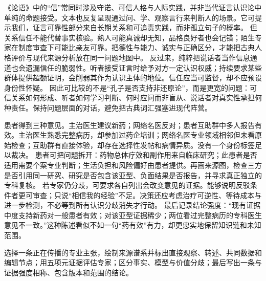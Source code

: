 《论语》中的“信”常同时涉及守诺、可信人格与人际实践，并非当代证言认识论中单纯的命题接受。文本也反复呈现通过问、学、观察言行来判断人的场景\parencite{analects2003}。它可提示我们，证言可靠性部分来自长期关系和可追责实践，而非孤立句子的概率。 但关系信任不能代替事实核验。熟人可能真诚却无知，品格良好者也会记错；陌生专家在制度审查下可能比亲友可靠。把德性与能力、诚实与正确区分，才能把古典人格评价与现代来源分析放在同一问题地图中。 反过来，纯粹把说话者当作信息通道也会遗漏信任的脆弱性。听者接受证言时给予对方一定认识权威；持续要求某些群体提供超额证明，会削弱其作为认识主体的地位。信任应当可监督，却不应预设身份性怀疑。 因此可比较的不是“孔子是否支持非还原论”，而是更宽的问题：可信关系如何形成、听者如何学习判断、何时应问而非盲从、说话者对真实性承担何种责任。保持问题层面的对话，避免把古典词汇强塞进现代阵营。

患者得到三种意见。主治医生建议新药；网络名医反对；患者互助群中多人报告有效。主治医生熟悉完整病历，却参加过药企培训；网络名医专业领域相邻但未看原始检查；互助群有直接体验，却存在选择性发帖和病情异质。没有一个身份标签足以裁决。 患者可把问题拆开：药物总体疗效和副作用来自临床研究；此患者是否适用需要个案专业判断；生活负担和风险偏好由患者提供。再画来源图，检查三方是否引用同一研究、研究是否包含该亚型、负面结果是否报告，并寻求真正独立的专科复核。 若专家仍分歧，可要求各自列出会改变意见的证据。能够说明反驳条件者更可审查；只说“相信我的经验”不足。决策还应考虑治疗可逆性、等待成本与进一步检测，不必等到所有认识分歧消失才行动。 最后记录结论强度：“现有证据中度支持新药对一般患者有效；对该亚型证据稀少；两位看过完整病历的专科医生意见不一致。”这种陈述看似不如一句“药有效”有力，却更忠实地保留知识链和未知范围。

\begin{tcolorbox}[breakable,colback=white,colframe=blue!30!black,title={本章研读任务},fonttitle=\bfseries]
选择一条正在传播的专业主张，绘制来源谱系并标出直接观察、转述、共同数据和编辑节点；用五项元证据评估专家；区分事实、模型与价值分歧；最后写出一条与证据强度相称、包含版本和范围的结论。
\end{tcolorbox}
